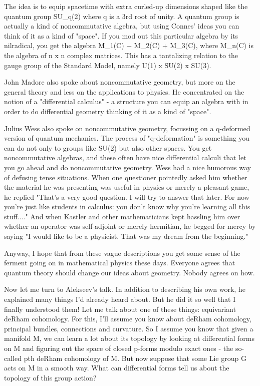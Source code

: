 The idea is to equip spacetime with extra curled-up dimensions shaped
like the quantum group SU_{q}(2) where q is a 3rd root of unity.  A
quantum group is actually a kind of noncommutative algebra, but using
Connes' ideas you can think of it as a kind of "space".  If you mod out
this particular algebra by its nilradical, you get the algebra M_{1}(C) +
M_{2}(C) + M_{3}(C), where M_{n}(C) is the algebra of n x n complex matrices. 
This has a tantalizing relation to the gauge group of the Standard
Model, namely U(1) x SU(2) x SU(3).  


John Madore also spoke about noncommutative geometry, but more on the
general theory and less on the applications to physics.  He concentrated
on the notion of a "differential calculus" - a structure you
can equip an algebra with in order to do differential geometry thinking
of it as a kind of "space".

Julius Wess also spoke on noncommutative geometry, focussing on a
q-deformed version of quantum mechanics.   The process of
"q-deformation" is something you can do not only to groups like SU(2)
but also other spaces.  You get noncommutative algebras, and these often
have nice differential calculi that let you go ahead and do
noncommutative geometry.  Wess had a nice humorous way of defusing tense
situations.  When one questioner pointedly asked him whether the
material he was presenting was useful in physics or merely a pleasant
game, he replied "That's a very good question.  I will try to answer
that later.  For now you're just like students in calculus: you don't
know why you're learning all this stuff...."  And when Kastler and other
mathematicians kept hassling him over whether an operator was
self-adjoint or merely hermitian, he begged for mercy by saying "I would
like to be a physicist.  That was my dream from the beginning."   

Anyway, I hope that from these vague descriptions you get some
sense of the ferment going on in mathematical physics these days.
Everyone agrees that quantum theory should change our ideas about
geometry.  Nobody agrees on how.  

Now let me turn to Alekseev's talk.   In addition to describing his own
work, he explained many things I'd already heard about.  But he  did it
so well that I finally understood them!  Let me talk about one of these
things: equivariant deRham cohomology.  For this, I'll assume you know
about deRham cohomology, principal bundles, connections and curvature. 
So I assume you know that given a manifold M, we can learn a lot about
its topology by looking at differential forms on M and figuring out the
space of closed p-forms modulo exact ones - the so-called pth deRham
cohomology of M.  But now suppose that some Lie group G acts on M in a
smooth way.  What can differential forms tell us about the topology of
this group action?

